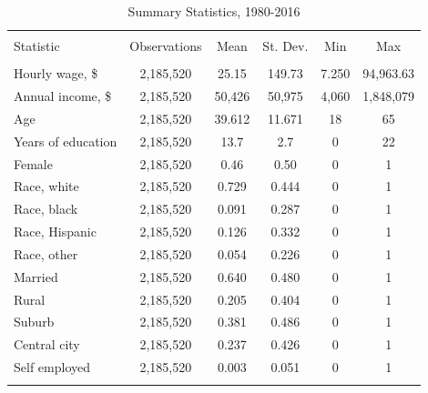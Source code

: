 \documentclass[notitlepage,12pt]{article}
\begin{document}
\begin{table}[!htbp] \centering 
  \caption{Summary Statistics, 1980-2016} 
  \label{} 
\begin{tabular}{@{\extracolsep{5pt}}lccccc} 
\\[-1.8ex]\hline 
\hline \\[-1.8ex] 
Statistic & \multicolumn{1}{c}{Observations} & \multicolumn{1}{c}{Mean} & \multicolumn{1}{c}{St. Dev.} & \multicolumn{1}{c}{Min} & \multicolumn{1}{c}{Max} \\ 
\hline \\[-1.8ex] 
Hourly wage, \$ & 2,185,520 & 25.15 & 149.73 & 7.250 & 94,963.63 \\  
Annual income, \$ & 2,185,520 & 50,426& 50,975 & 4,060 & 1,848,079 \\ 
Age & 2,185,520 & 39.612 & 11.671 & 18 & 65 \\ 
Years of education & 2,185,520 & 13.7 & 2.7 & 0 & 22 \\ 
Female & 2,185,520 & 0.46 & 0.50 & 0 & 1 \\ 
Race, white & 2,185,520 & 0.729 & 0.444 & 0 & 1 \\ 
Race, black & 2,185,520 & 0.091 & 0.287 & 0 & 1 \\ 
Race, Hispanic & 2,185,520 & 0.126 & 0.332 & 0 & 1 \\ 
Race, other & 2,185,520 & 0.054 & 0.226 & 0 & 1 \\ 
Married & 2,185,520 & 0.640 & 0.480 & 0 & 1 \\ 
Rural & 2,185,520 & 0.205 & 0.404 & 0 & 1 \\ 
Suburb & 2,185,520 & 0.381 & 0.486 & 0 & 1 \\ 
Central city & 2,185,520 & 0.237 & 0.426 & 0 & 1 \\ 
Self employed & 2,185,520 & 0.003 & 0.051 & 0 & 1 \\ 
\hline \\[-1.8ex] 
\end{tabular} 
\end{table}
\end{document}
